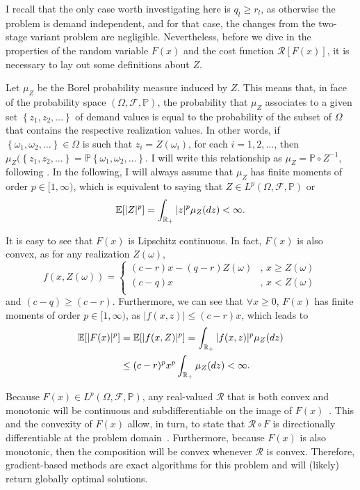 \documentclass[12pt]{article}
\begin{document}
I recall that the only case worth investigating here is $q_l \ge r_l$, as otherwise the problem is demand independent, and for that case, the changes from the two-stage variant problem are negligible.
Nevertheless, before we dive in the properties of the random variable $F(x)$ and the cost function $\mathcal{R}[F(x)]$, it is necessary to lay out some definitions about $Z$.

Let $\mu_Z$ be the Borel probability measure induced by $Z$.
This means that, in face of the probability space $\left( \Omega,\mathcal{F},\mathbb{P} \right)$, the probability that $\mu_Z$ associates to a given set $\left\{ z_1,z_2,\ldots \right\} $ of demand values is equal to the probability of the subset of $\Omega$ that contains the respective realization values. 
In other words, if $\left\{ \omega_1,\omega_2,\ldots \right\}\in \Omega$ is such that $z_i=Z(\omega_i)$, for each $i=1,2,\ldots$, then $\mu_Z(\left\{ z_1,z_2,\ldots \right\} = \mathbb{P}\left\{ \omega_1,\omega_2,\ldots \right\}$.
I will write this relationship as $\mu_Z = \mathbb{P} \circ Z^{-1}$, following \citet{burtscheidtBilevelLinearOptimization2020}.
In the following, I will always assume that $\mu_Z$ has finite moments of order $p\in [1,\infty)$, which is equivalent to saying that $Z \in L^{p}\left( \Omega, \mathcal{F},\mathbb{P} \right)$ or \[
    \mathbb{E}[|Z|^{p}] = \int_{\mathbb{R}_{+}} |z|^{p} \mu_Z(dz) < \infty
.\]

It is easy to see that $F(x)$ is Lipschitz continuous.
In fact, $F(x)$ is also convex, as for any realization $Z(\omega)$, \[
    f(x,Z(\omega)) = \begin{cases}
	(c-r)x - (q-r)Z(\omega) &,\, x \ge Z(\omega) \\
	(c-q)x &,\, x < Z(\omega) \\
    \end{cases}
\] and $(c-q) \ge (c-r)$.
Furthermore, we can see that $\forall x\ge 0$, $F(x)$ has finite moments of order $p\in [1,\infty)$, as $|f(x,z)| \le (c-r)x$, which leads to
\begin{align*}
    \mathbb{E}[|F(x)|^{p}] &= \mathbb{E}[|f(x,Z)|^{p}] = \int_{\mathbb{R}_{+}} |f(x,z)|^{p} \mu_Z(dz) \\
    &\le  (c-r)^{p} x^{p} \int_{\mathbb{R}_{+}} \mu_Z(dz) < \infty
.\end{align*}

Because $F(x)\in L^{p}\left( \Omega, \mathcal{F},\mathbb{P} \right)$, any real-valued $\mathcal{R}$ that is both convex and monotonic will be continuous and subdifferentiable on the image of $F(x)$~\citep[Proposition~6.5]{shapiroLecturesStochasticProgramming2009}.
This and the convexity of $F(x)$ allow, in turn, to state that $\mathcal{R}\circ F$ is directionally differentiable at the problem domain~\citet[Theorem~6.10]{shapiroLecturesStochasticProgramming2009}.
Furthermore, because $F(x)$ is also monotonic, then the composition will be convex whenever $\mathcal{R}$ is convex.
Therefore, gradient-based methods are exact algorithms for this problem and will (likely) return globally optimal solutions.
\end{document}
